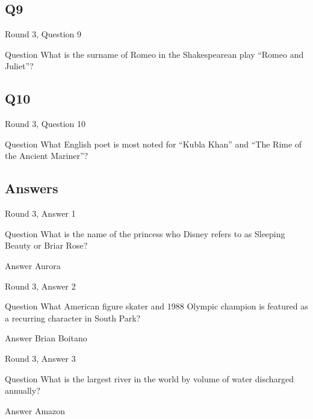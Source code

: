 \documentclass[11pt]{beamer}
\begin{document}
\subsection*{Q9}
\begin{frame}[t]{Round 3, Question 9}
\vspace{2em}
\begin{block}{Question}
What is the surname of Romeo in the Shakespearean play ``Romeo and Juliet''\@?
\end{block}
\end{frame}
    

\subsection*{Q10}
\begin{frame}[t]{Round 3, Question 10}
\vspace{2em}
\begin{block}{Question}
What English poet is most noted for ``Kubla Khan'' and ``The Rime of the Ancient Mariner''\@?
\end{block}
\end{frame}
    
\subsection{Answers}

\begin{frame}[t]{Round 3, Answer 1}
\vspace{2em}
\begin{block}{Question}
What is the name of the princess who Disney refers to as Sleeping Beauty or Briar Rose\@?
\end{block}
\pause{}
\begin{block}{Answer}
Aurora
\end{block}
\end{frame}
    

\begin{frame}[t]{Round 3, Answer 2}
\vspace{2em}
\begin{block}{Question}
What American figure skater and 1988 Olympic champion is featured as a recurring character in South Park\@?
\end{block}
\pause{}
\begin{block}{Answer}
Brian Boitano
\end{block}
\end{frame}
    

\begin{frame}[t]{Round 3, Answer 3}
\vspace{2em}
\begin{block}{Question}
What is the largest river in the world by volume of water discharged annually\@?
\end{block}
\pause{}
\begin{block}{Answer}
Amazon
\end{block}
\end{frame}
    
\end{document}
